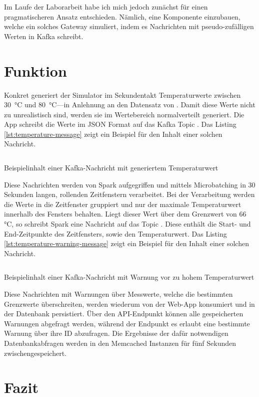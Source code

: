 Im Laufe der Laborarbeit habe ich mich jedoch zunächst für einen pragmatischeren Ansatz entschieden.
Nämlich, eine Komponente einzubauen, welche ein solches Gateway simuliert, indem es Nachrichten mit pseudo-zufälligen Werten in Kafka schreibt.

\section{Funktion}\label{sec:funktion}

Konkret generiert der Simulator im Sekundentakt Temperaturwerte zwischen 30~°C und 80~°C---in Anlehnung an den Datensatz von \cite{helwig_condition_2015}.
Damit diese Werte nicht zu unrealistisch sind, werden sie im Wertebereich normalverteilt generiert.
Die App schreibt die Werte im JSON Format auf das Kafka Topic .
Das Listing \ref{lst:temperature-message} zeigt ein Beispiel für den Inhalt einer solchen Nachricht.

\begin{listing}[H]
  \inputminted{json}{assets/src/temperature-message.json}
  \caption{Beispielinhalt einer Kafka-Nachricht mit generiertem Temperaturwert}\label{lst:temperature-message}
\end{listing}

Diese Nachrichten werden von Spark aufgegriffen und mittels Microbatching in 30 Sekunden langen, rollenden Zeitfenstern verarbeitet.
Bei der Verarbeitung werden die Werte in die Zeitfenster gruppiert und nur der maximale Temperaturwert innerhalb des Fensters behalten.
Liegt dieser Wert über dem Grenzwert von 66 °C, so schreibt Spark eine Nachricht auf das Topic .
Diese enthält die Start- und End-Zeitpunkte des Zeitfensters, sowie den Temperaturwert.
Das Listing \ref{lst:temperature-warning-message} zeigt ein Beispiel für den Inhalt einer solchen Nachricht.

\begin{listing}[H]
  \inputminted{json}{assets/src/temperature-warning-message.json}
  \caption{Beispielinhalt einer Kafka-Nachricht mit Warnung vor zu hohem Temperaturwert}\label{lst:temperature-warning-message}
\end{listing}

Diese Nachrichten mit Warnungen über Messwerte, welche die bestimmten Grenzwerte überschreiten, werden wiederum von der Web-App konsumiert und in der Datenbank persistiert.
Über den API-Endpunkt  können alle gespeicherten Warnungen abgefragt werden, während der Endpunkt  es erlaubt eine bestimmte Warnung über ihre ID abzufragen.
Die Ergebnisse der dafür notwendigen Datenbankabfragen werden in den Memcached Instanzen für fünf Sekunden zwischengespeichert.

\section{Fazit}\label{sec:fazit}
